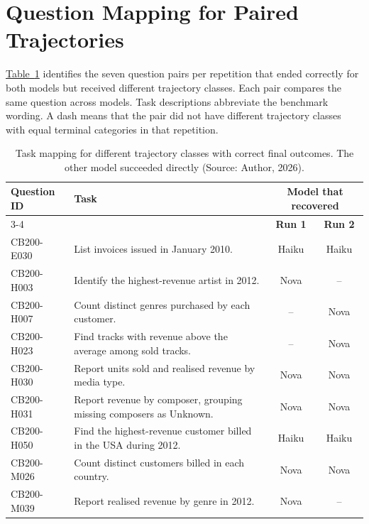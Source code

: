 \clearpage
\section{Question Mapping for Paired Trajectories}
\label{app:paired-trajectories}

\hyperref[tab:results-paired-trajectories]{Table~\ref*{tab:results-paired-trajectories}}
identifies the seven question pairs per repetition that ended correctly for
both models but received different trajectory classes. Each pair compares
the same question across models. Task descriptions abbreviate the benchmark
wording. A dash means that the pair did not have different trajectory classes
with equal terminal categories in that repetition.

\begin{table}[H]
\centering
{\small
\renewcommand{\arraystretch}{1.15}
\setlength{\tabcolsep}{4pt}
\begin{tabularx}{\textwidth}{@{}l>{\raggedright\arraybackslash}Xcc@{}}
\toprule
\textbf{Question ID} & \textbf{Task} & \multicolumn{2}{c}{\textbf{Model that recovered}} \\
\cmidrule(l){3-4}
 & & \textbf{Run 1} & \textbf{Run 2} \\
\midrule
CB200-E030 & List invoices issued in January 2010. & Haiku & Haiku \\
\addlinespace
CB200-H003 & Identify the highest-revenue artist in 2012. & Nova & -- \\
\addlinespace
CB200-H007 & Count distinct genres purchased by each customer. & -- & Nova \\
\addlinespace
CB200-H023 & Find tracks with revenue above the average among sold tracks. & -- & Nova \\
\addlinespace
CB200-H030 & Report units sold and realised revenue by media type. & Nova & Nova \\
\addlinespace
CB200-H031 & Report revenue by composer, grouping missing composers as Unknown. & Nova & Nova \\
\addlinespace
CB200-H050 & Find the highest-revenue customer billed in the USA during 2012. & Haiku & Haiku \\
\addlinespace
CB200-M026 & Count distinct customers billed in each country. & Nova & Nova \\
\addlinespace
CB200-M039 & Report realised revenue by genre in 2012. & Nova & -- \\
\bottomrule
\end{tabularx}
}
\caption{Task mapping for different trajectory classes with correct final outcomes. The other model succeeded directly (Source: Author, 2026).}
\label{tab:results-paired-trajectories}
\end{table}

